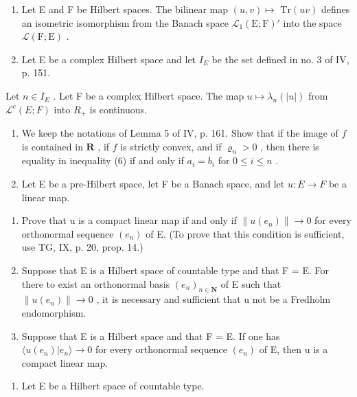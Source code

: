 \begin{enumerate}
\def\labelenumi{\arabic{enumi})}
\setcounter{enumi}{16}
\item
  Let E and F be Hilbert spaces. The bilinear map \((u,v)\mapsto\) \(\mathrm{Tr}(uv)\) defines an isometric isomorphism from the Banach space \(\mathcal{L}_1(\mathrm{E};\mathrm{F})'\) into the space \(\mathcal{L}(\mathrm{F};\mathrm{E})\) .
\item
  Let E be a complex Hilbert space and let \(I_{E}\) be the set defined in no. 3 of IV, p. 151.
\end{enumerate}

Let \(n \in I_{E}\) . Let F be a complex Hilbert space. The map \(u \mapsto \lambda_{n}(|u|)\) from \(\mathcal{L}^{c}(E;F)\) into \(R_{+}\) is continuous.

\begin{enumerate}
\def\labelenumi{\arabic{enumi})}
\setcounter{enumi}{18}
\item
  We keep the notations of Lemma 5 of IV, p. 161. Show that if the image of \(f\) is contained in \(\mathbf{R}\) , if \(f\) is strictly convex, and if \(\varrho_n > 0\) , then there is equality in inequality (6) if and only if \(a_i = b_i\) for \(0 \leqslant i \leqslant n\) .
\item
  Let E be a pre-Hilbert space, let F be a Banach space, and let \(u: E \to F\) be a linear map.
\end{enumerate}

\begin{enumerate}
\def\labelenumi{\alph{enumi})}
\item
  Prove that u is a compact linear map if and only if \(\|u(e_{n})\|\to0\) for every orthonormal sequence \((e_{n})\) of E. (To prove that this condition is sufficient, use TG, IX, p. 20, prop. 14.)
\item
  Suppose that E is a Hilbert space of countable type and that F = E. For there to exist an orthonormal basis \((e_{n})_{n\in\mathbf{N}}\) of E such that \(\|u(e_{n})\|\to0\) , it is necessary and sufficient that u not be a Fredholm endomorphism.
\item
  Suppose that E is a Hilbert space and that F = E. If one has \(\langle u(e_{n}) | e_{n} \rangle \to 0\) for every orthonormal sequence \((e_{n})\) of E, then u is a compact linear map.
\end{enumerate}

\begin{enumerate}
\def\labelenumi{\arabic{enumi})}
\setcounter{enumi}{20}
\tightlist
\item
  Let E be a Hilbert space of countable type.
\end{enumerate}

